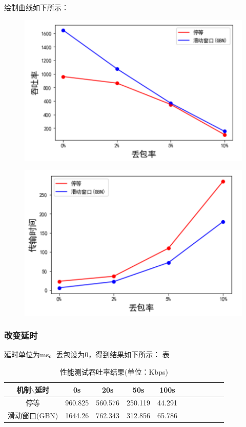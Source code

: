 \documentclass[UTF8,a4paper,10pt]{ctexart}
\begin{document}
绘制曲线如下所示：
\begin{figure}[H]
    \centering
    \includegraphics[scale=0.6]{计网1.png}
    \label{fig:1}
\end{figure}
\begin{figure}[H]
    \centering
    \includegraphics[scale=0.6]{计网2.png}
    \label{fig:2}
\end{figure}
\subsubsection{改变延时}
延时单位为ms。丢包设为0，得到结果如下所示：
表
\begin{table}[!htbp]
  \centering
  \begin{tabular}{ccccccccccc}
  \toprule  
  机制$\backslash$延时& 0s& 20s& 50s& 100s\\
  \midrule
  停等& 960.825& 560.576& 250.119& 44.291\\
  滑动窗口(GBN)& 1644.26& 762.343& 312.856& 65.786\\
  \bottomrule
  \end{tabular}
  \caption{性能测试吞吐率结果(单位：Kbps)}
\end{table}
\end{document}
